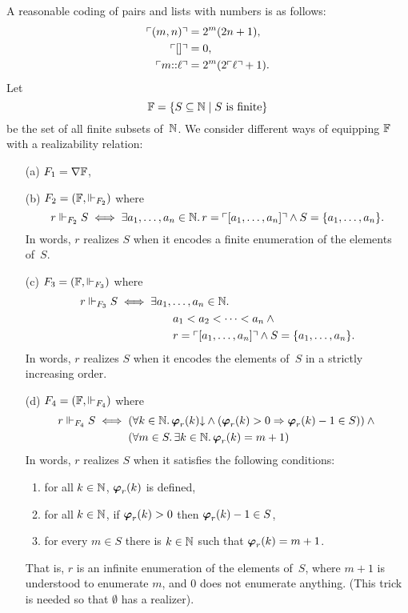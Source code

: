 \documentclass{article}
\begin{document}
A reasonable coding of pairs and lists with numbers is as follows:
%
\begin{align*}
  \code{(m, n)} &= 2^m (2 n + 1), \\
  \code{[]} &= 0, \\
  \code{\cons{m}{\ell}} &= 2^m (2 \code{\ell} +1).
\end{align*}
%
Let $$\FF = \set{ S \subseteq \NN \such \text{$S$ is finite} }$$ be the set of all finite subsets of~$\NN$. We consider 
different ways of equipping $\FF$ with a realizability relation:
%
\begin{enumerate}
\item[(a)] $F_1 = \nabla \FF$,

\item[(b)] $F_2 = (\FF, {\rz[F_2]})$ where
  \begin{equation*}
    r \rz[F_2] S \iff
    \some{a_1, \ldots, a_n \in \NN}
    r = \code{[a_1, \ldots, a_n]} \land S = \set{a_1, \ldots, a_n}.
  \end{equation*}
  In words, $r$ realizes $S$ when it encodes a finite enumeration of the elements of~$S$.

\item[(c)] $F_3 = (\FF, {\rz[F_3]})$ where
  \begin{equation*}
    r \rz[F_3] S \iff
    \begin{aligned}[t]
      & \some{a_1, \ldots, a_n \in \NN} \\
      & \qquad a_1 < a_2 < \cdots < a_n \land {} \\
      & \qquad r = \code{[a_1, \ldots, a_n]} \land S = \set{a_1, \ldots, a_n}.
    \end{aligned}
  \end{equation*}
  In words, $r$ realizes $S$ when it encodes the elements of~$S$ in a strictly increasing order.

\item[(d)] $F_4 = (\FF, {\rz[F_4]})$ where
  \begin{equation*}
    r \rz[F_4] S \iff
    \begin{aligned}[t]
      & (\all{k \in \NN} \defined{\pr{r}{k}} \land (\pr{r}{k} > 0 \lthen \pr{r}{k} - 1\in S)) \land {} \\
      & (\all{m \in S} \some{k \in \NN} \pr{r}{k} = m + 1)
    \end{aligned}
  \end{equation*}
  In words, $r$ realizes $S$ when it satisfies the following conditions:
  \begin{enumerate}
  \item for all $k \in \NN$, $\pr{r}{k}$ is defined,
  \item for all $k \in \NN$, if $\pr{r}{k} > 0$ then $\pr{r}{k} - 1 \in S$,
  \item for every $m \in S$ there is $k \in \NN$ such that $\pr{r}{k} = m + 1$.
  \end{enumerate}
  That is, $r$ is an infinite enumeration of the elements of~$S$, where $m + 1$ is understood to enumerate $m$, and $0$ does not enumerate anything. (This trick is needed so that $\emptyset$ has a realizer).
\end{enumerate}
\end{document}
